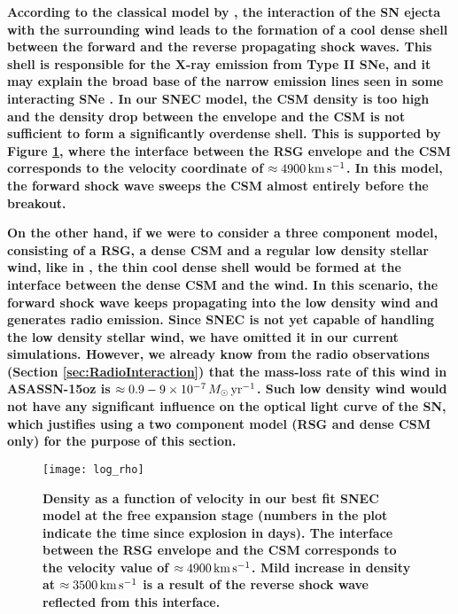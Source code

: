 \documentclass[a4paper,fleqn,usenatbib]{mnras}
\begin{document}
\textbf{According to the classical model by \citet{1982chevalier}, the interaction of the SN ejecta with the surrounding wind leads to the formation of a cool dense shell between the forward and the reverse propagating shock waves. 
This shell is responsible for the X-ray emission from Type II SNe, and it may explain the broad base of the narrow emission lines seen in some interacting SNe \citep{2001chugai}. 
In our SNEC model, the CSM density is too high and the density drop between the envelope and the CSM is not sufficient to form a significantly overdense shell. 
This is supported by Figure \ref{fig:CDS}, where the interface between the RSG envelope and the CSM corresponds to the velocity coordinate of $\approx 4900\,{\rm km}\,{\rm s}^{-1}$. 
In this model, the forward shock wave sweeps the CSM almost entirely before the breakout.}

\textbf{On the other hand, if we were to consider a three component model, consisting of a RSG, a dense CSM and a regular low density stellar wind, like in \citet{2018morozova}, the thin cool dense shell would be formed at the interface between the dense CSM and the wind. 
In this scenario, the forward shock wave keeps propagating into the low density wind and generates radio emission. Since SNEC is not yet capable of handling the low density stellar wind, we have omitted it in our current simulations. 
However, we already know from the radio observations (Section \ref{sec:RadioInteraction}) that the mass-loss rate of this wind in ASASSN-15oz is $\approx 0.9-9\times 10^{-7}\,M_{\odot}\,{\rm yr}^{-1}$.
Such low density wind would not have any significant influence on the optical light curve of the SN, which justifies using a two component model (RSG and dense CSM only) for the purpose of this section.}
\begin{figure}
\begin{center}
\texttt{[image: log\_rho]} %
\caption{\textbf{Density as a function of velocity in our best fit SNEC model at the free expansion stage (numbers in the plot indicate the time since explosion in days). 
The interface between the RSG envelope and the CSM corresponds to the velocity value of $\approx 4900\,{\rm km}\,{\rm s}^{-1}$. 
Mild increase in density at $\approx 3500\,{\rm km}\,{\rm s}^{-1}$ is a result of the reverse shock wave reflected from this interface.}}
\label{fig:CDS}
\end{center}
\end{figure}
\end{document}
